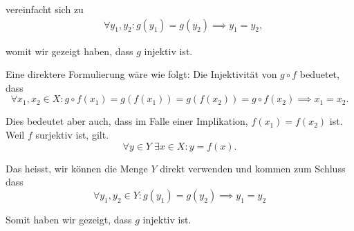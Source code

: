 \begin{imp-ex}
\begin{enumerate}[label=(\roman*)]
{      vereinfacht sich zu 
      \begin{equation}
        \begin{aligned}
          &\forall y_1,y_2: g(y_1) = g(y_2) \implies y_1=y_2,
        \end{aligned}
      \end{equation}
      
      womit wir gezeigt haben, dass $g$ injektiv ist.
      
      Eine direktere Formulierung wäre wie folgt: Die Injektivität von $g \circ f$ beduetet, dass  
      \begin{equation}
        \forall x_1, x_2 \in X:
        g \circ f (x_1) = g (f(x_1)) = g(f(x_2)) = g \circ f(x_2) \implies x_1 = x_2.
      \end{equation}
      
      Dies bedeutet aber auch, dass im Falle einer Implikation, $f(x_1) = f(x_2)$ ist. Weil $f$ surjektiv ist, gilt. \begin{equation}
        \forall y \in Y \; \exists x \in X: y = f(x).
      \end{equation}
      
      Das heisst, wir können die Menge $Y$ direkt verwenden und kommen zum Schluss dass
      \begin{equation}
        \forall y_1, y_2 \in Y: g(y_1) = g(y_2) \implies y_1 = y_2
      \end{equation} 
      
      Somit haben wir gezeigt, dass $g$ injektiv ist.
    } 
  \end{enumerate}
\end{imp-ex}
